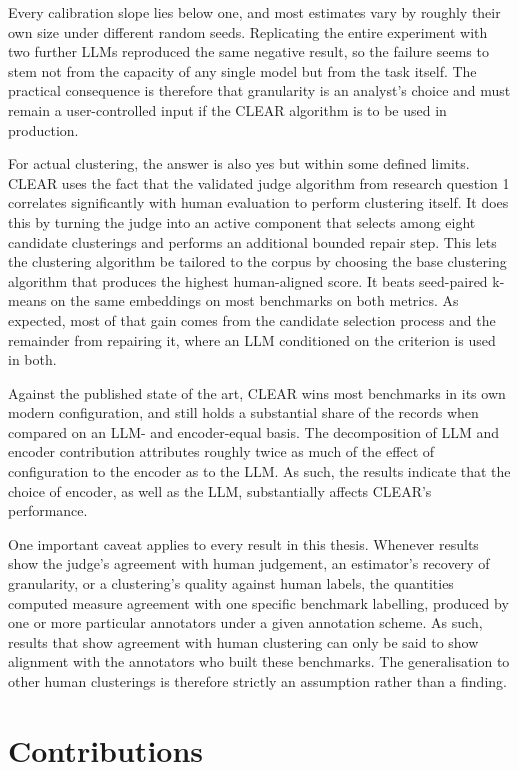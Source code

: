 \documentclass[11pt,a4paper,oneside]{report}
\begin{document}
Every calibration slope lies below one, and most estimates
vary by roughly their own size under different random seeds. Replicating the entire experiment with two further LLMs reproduced the
same negative result, so the failure seems to stem not from the capacity of
any single model but from the task itself. The practical consequence is therefore that granularity is an analyst's choice and must
remain a user-controlled input if the CLEAR algorithm is to be used in production.




For actual clustering, the answer is also yes but within some defined limits. CLEAR uses the fact that the validated judge algorithm from research question 1 correlates significantly with human evaluation to perform clustering itself. It does this by turning the judge into an active component that selects among eight candidate clusterings and performs an additional bounded repair step. This lets the clustering algorithm be tailored to the corpus by choosing the base clustering algorithm that produces the highest human-aligned score. It beats seed-paired k-means on the same embeddings on most benchmarks on both metrics. As expected, most of that gain comes from the candidate selection process and the remainder from repairing it, where an LLM conditioned on the criterion is used in both. 

Against the published state of the art, CLEAR wins most benchmarks in its own modern configuration, and still holds a substantial share of the records when compared on an LLM- and encoder-equal basis. The decomposition of LLM and encoder contribution attributes roughly twice as much of the effect of configuration to the encoder as to the LLM. As such, the results indicate that the choice of encoder, as well as the LLM, substantially affects CLEAR's performance. 

One important caveat applies to every result in this thesis.
Whenever results show the judge's agreement with human
judgement, an estimator's recovery of granularity, or a
clustering's quality against human labels, the quantities computed measure agreement with one specific benchmark labelling, produced
by one or more particular annotators under a given annotation scheme. As such, results that show agreement with human clustering can only be said to show alignment with the annotators who built these benchmarks. The generalisation to other
human clusterings is therefore strictly an assumption rather than a finding.


\section{Contributions}
\end{document}
